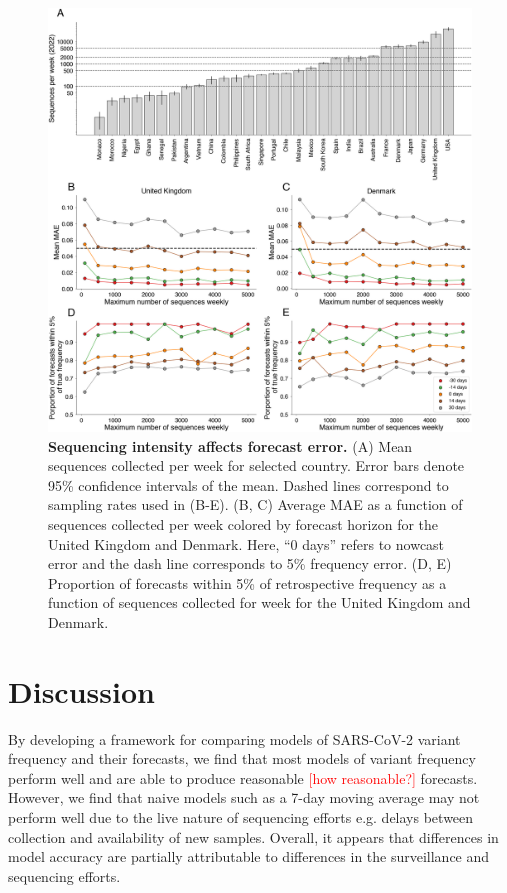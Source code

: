 \documentclass[11pt,oneside,letterpaper]{article}
\def\jhc#1{\textcolor{red}{[#1]}}
\begin{document}
\begin{figure}[H]
    \centering
    \includegraphics[width=0.8\linewidth]{figures/downscaling_sequencing.png}
    \caption{\textbf{Sequencing intensity affects forecast error.}
    (A) Mean sequences collected per week for selected country. Error bars denote 95\% confidence intervals of the mean. Dashed lines correspond to sampling rates used in (B-E).
    (B, C) Average MAE as a function of sequences collected per week colored by forecast horizon for the United Kingdom and Denmark. Here, ``0 days'' refers to nowcast error and the dash line corresponds to 5\% frequency error.
    (D, E) Proportion of forecasts within 5\% of retrospective frequency as a function of sequences collected for week for the United Kingdom and Denmark.
  }%
    \label{fig:downscaling}
\end{figure}

\section*{Discussion}




By developing a framework for comparing models of SARS-CoV-2 variant frequency and their forecasts, we find that most models of variant frequency perform well and are able to produce reasonable \jhc{how reasonable?} forecasts.
However, we find that naive models such as a 7-day moving average may not perform well due to the live nature of sequencing efforts e.g. delays between collection and availability of new samples.
Overall, it appears that differences in model accuracy are partially attributable to differences in the surveillance and sequencing efforts.
\end{document}
